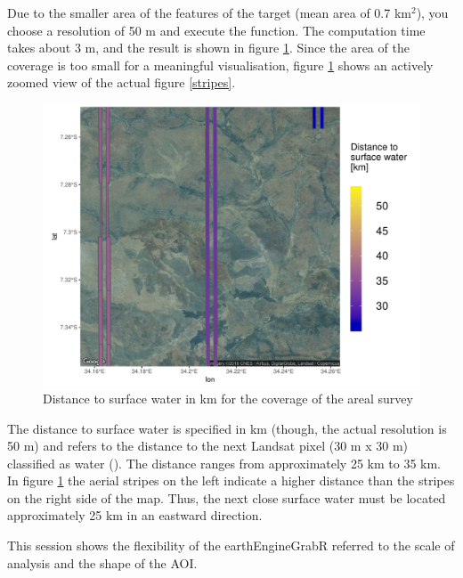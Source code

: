 Due to the smaller area of the features of the target (mean area of 0.7 km$^2$), you choose a resolution of 50 m and execute the function. The computation time takes about 3 m, and the result is shown in figure \ref{session_2}. Since the area of the coverage is too small for a meaningful visualisation, figure \ref{session_2} shows an actively zoomed view of the actual figure \ref{stripes}. 

\begin{center}
	\begin{figure}[h]
		\begin{center}
			\includegraphics[width=15cm]{images/stripes_distance_2.pdf}
			\caption{Distance to surface water in km for the coverage of the areal survey}
			\label{session_2}
		\end{center}
	\end{figure}
\end{center}

The distance to surface water is specified in km (though, the actual resolution is 50 m) and refers to the distance to the next Landsat pixel (30 m x 30 m) classified as water (\cite{pekel2016high}). The distance ranges from approximately 25 km to 35 km. In figure \ref{session_2} the aerial stripes on the left indicate a higher distance than the stripes on the right side of the map. Thus, the next close surface water must be located approximately 25 km in an eastward direction. 

This session shows the flexibility of the earthEngineGrabR referred to the scale of analysis and the shape of the AOI.

